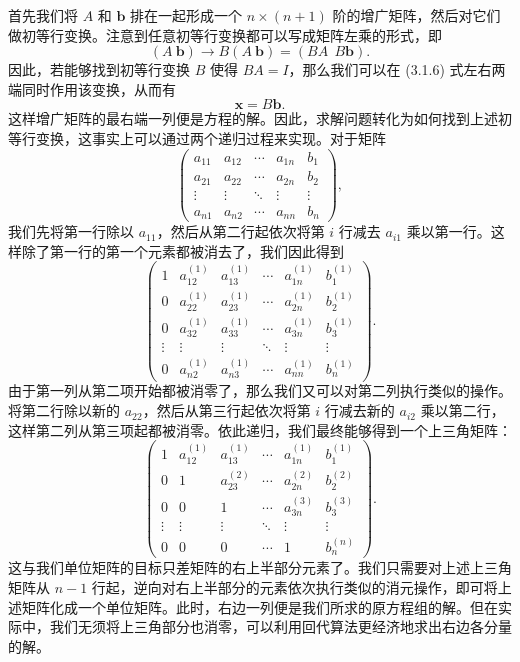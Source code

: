 首先我们将 $A$ 和 $\bm b$ 排在一起形成一个 $n\times(n+1)$ 阶的增广矩阵，然后对它们做初等行变换。注意到任意初等行变换都可以写成矩阵左乘的形式，即
\begin{equation}
(A\ \bm b)\longrightarrow B(A\ \bm b)=(BA\ \ B\bm b).
\tag{3.1.7}
\end{equation}
因此，若能够找到初等行变换 $B$ 使得 $BA=I$，那么我们可以在 (3.1.6) 式左右两端同时作用该变换，从而有
\begin{equation}
\bm x=B\bm b.
\tag{3.1.8}
\end{equation}
这样增广矩阵的最右端一列便是方程的解。因此，求解问题转化为如何找到上述初等行变换，这事实上可以通过两个递归过程来实现。对于矩阵
\begin{equation}
\left(
\begin{array}{cccc|c}
a_{11}&a_{12}&\cdots&a_{1n}&b_1\\
a_{21}&a_{22}&\cdots&a_{2n}&b_2\\
\vdots&\vdots&\ddots&\vdots&\vdots\\
a_{n1}&a_{n2}&\cdots&a_{nn}&b_n
\end{array}
\right),
\tag{3.1.9}
\end{equation}
我们先将第一行除以 $a_{11}$，然后从第二行起依次将第 $i$ 行减去 $a_{i1}$ 乘以第一行。这样除了第一行的第一个元素都被消去了，我们因此得到
\begin{equation}
\left(
\begin{array}{ccccc|c}
1&a_{12}^{(1)}&a_{13}^{(1)}&\cdots&a_{1n}^{(1)}&b_1^{(1)}\\
0&a_{22}^{(1)}&a_{23}^{(1)}&\cdots&a_{2n}^{(1)}&b_2^{(1)}\\
0&a_{32}^{(1)}&a_{33}^{(1)}&\cdots&a_{3n}^{(1)}&b_3^{(1)}\\
\vdots&\vdots&\vdots&\ddots&\vdots&\vdots\\
0&a_{n2}^{(1)}&a_{n3}^{(1)}&\cdots&a_{nn}^{(1)}&b_n^{(1)}
\end{array}
\right).
\tag{3.1.10}
\end{equation}
由于第一列从第二项开始都被消零了，那么我们又可以对第二列执行类似的操作。将第二行除以新的 $a_{22}$，然后从第三行起依次将第 $i$ 行减去新的 $a_{i2}$ 乘以第二行，这样第二列从第三项起都被消零。依此递归，我们最终能够得到一个上三角矩阵：
\begin{equation}
\left(
\begin{array}{ccccc|c}
1&a_{12}^{(1)}&a_{13}^{(1)}&\cdots&a_{1n}^{(1)}&b_1^{(1)}\\
0&1&a_{23}^{(2)}&\cdots&a_{2n}^{(2)}&b_2^{(2)}\\
0&0&1&\cdots&a_{3n}^{(3)}&b_3^{(3)}\\
\vdots&\vdots&\vdots&\ddots&\vdots&\vdots\\
0&0&0&\cdots&1&b_n^{(n)}
\end{array}
\right).
\tag{3.1.11}
\end{equation}
这与我们单位矩阵的目标只差矩阵的右上半部分元素了。我们只需要对上述上三角矩阵从 $n-1$ 行起，逆向对右上半部分的元素依次执行类似的消元操作，即可将上述矩阵化成一个单位矩阵。此时，右边一列便是我们所求的原方程组的解。但在实际中，我们无须将上三角部分也消零，可以利用回代算法更经济地求出右边各分量的解。

